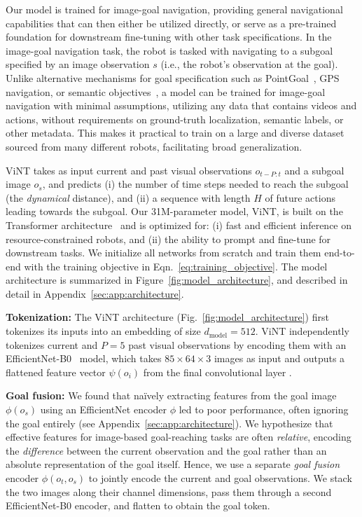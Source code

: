 \documentclass{article}
\newcommand{\ModelName}{ViNT\xspace}
\newcommand{\basement}{foundation\xspace}
\newcommand{\MyPara}[1]{\noindent\textbf{#1}}
\begin{document}
Our model is trained for image-goal navigation, providing general navigational capabilities that can then either be utilized directly, or serve as a pre-trained \basement for downstream fine-tuning with other task specifications. In the image-goal navigation task, the robot is tasked with navigating to a subgoal specified by an image observation $s$ (i.e., the robot's observation at the goal).
Unlike alternative mechanisms for goal specification such as PointGoal~\cite{anderson2018evaluation}, GPS navigation, or semantic objectives~\cite{wani2020multi}, a model can be trained for image-goal navigation with minimal assumptions, utilizing any data that contains videos and actions, without requirements on ground-truth localization, semantic labels, or other metadata. This makes it practical to train on a large and diverse dataset sourced from many different robots, facilitating broad generalization.

\ModelName takes as input current and past visual observations $o_{t-P:t}$ and a subgoal image $o_s$,
and predicts (i) the number of time steps needed to reach the subgoal (the \emph{dynamical} distance), and (ii) a sequence with length $H$ of future actions leading towards the subgoal.
Our 31M-parameter model, \ModelName, is built on the Transformer architecture~\cite{vaswani2017attention} and is optimized for: (i) fast and efficient inference on resource-constrained robots, and (ii) the ability to prompt and fine-tune for downstream tasks. We initialize all networks from scratch and train them end-to-end with the training objective in Eqn.~\ref{eq:training_objective}. The model architecture is summarized in Figure~\ref{fig:model_architecture}, and described in detail in Appendix~\ref{sec:app:architecture}.

\MyPara{Tokenization:} The \ModelName architecture (Fig.~\ref{fig:model_architecture}) first tokenizes its inputs into an embedding of size $d_\text{model} = 512$. \ModelName independently tokenizes current and $P=5$ past visual observations by encoding them with an EfficientNet-B0~\cite{tan2020efficientnet} model, which takes $85 \times 64 \times 3$ images as input and outputs a flattened feature vector $\psi(o_{i})$ from the final convolutional layer \cite{brohan2022rt1}.

\MyPara{Goal fusion:} 
We found that na\"{i}vely extracting features from the goal image $\phi(o_s)$ using an EfficientNet encoder $\phi$ led to poor performance, often ignoring the goal entirely (see Appendix~\ref{sec:app:architecture}). We hypothesize that effective features for image-based goal-reaching tasks are often \emph{relative}, encoding the \emph{difference} between the current observation and the goal rather than an absolute representation of the goal itself. Hence, we use a separate \emph{goal fusion} encoder $\phi(o_t, o_s)$ to jointly encode the current and goal observations. We stack the two images along their channel dimensions, pass them through a second EfficientNet-B0 encoder, and flatten to obtain the goal token.
\end{document}
